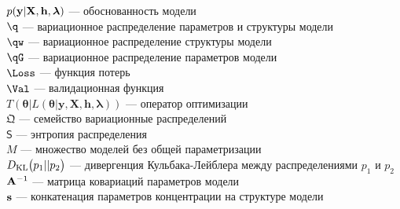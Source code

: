 $p(\mathbf{y}|\mathbf{X}, \mathbf{h},\boldsymbol{\lambda})$ --- обоснованность модели\\
$\q$ --- вариационное распределение параметров и структуры модели\\
$\qw$ --- вариационное распределение структуры модели\\
$\qG$ --- вариационное распределение параметров модели\\
$\Loss$ --- функция потерь\\
$\Val$ --- валидационная функция\\
$T(\boldsymbol{\theta} |L(\boldsymbol{\theta} |\mathbf{y},\mathbf{X},\mathbf{h},\boldsymbol{\lambda}))$ --- оператор оптимизации\\
$\mathfrak{Q}$ --- семейство вариационные распределений\\
$\mathsf{S}$ --- энтропия распределения\\
$M$ --- множество моделей без общей параметризации\\
$D_\text{KL}\bigl(p_1 || p_2\bigr)$ --- дивергенция Кульбака-Лейблера  между распределениями $p_1$ и $p_2$
$\mathbf{A}^{-1}$ --- матрица ковариаций параметров модели\\
$\mathbf{s}$ --- конкатенация параметров концентрации на структуре модели

